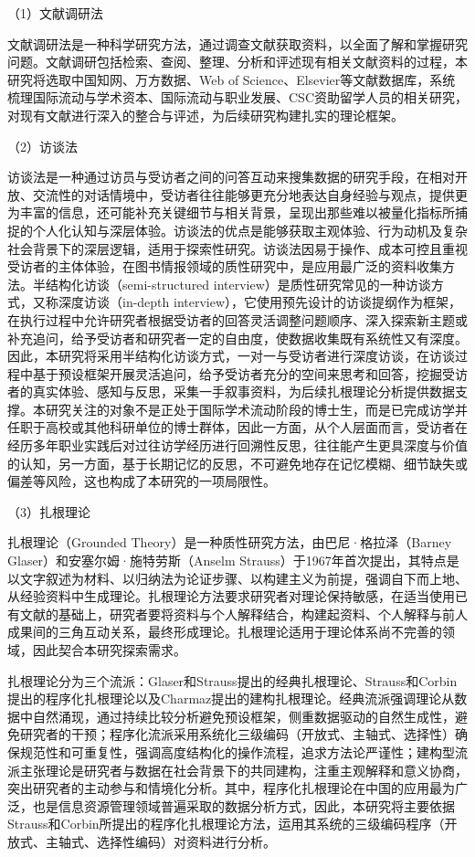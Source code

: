 （1）文献调研法

文献调研法是一种科学研究方法，通过调查文献获取资料，以全面了解和掌握研究问题。文献调研包括检索、查阅、整理、分析和评述现有相关文献资料的过程，本研究将选取中国知网、万方数据、Web of Science、Elsevier等文献数据库，系统梳理国际流动与学术资本、国际流动与职业发展、CSC资助留学人员的相关研究，对现有文献进行深入的整合与评述，为后续研究构建扎实的理论框架。

（2）访谈法

访谈法是一种通过访员与受访者之间的问答互动来搜集数据的研究手段，在相对开放、交流性的对话情境中，受访者往往能够更充分地表达自身经验与观点，提供更为丰富的信息，还可能补充关键细节与相关背景，呈现出那些难以被量化指标所捕捉的个人化认知与深层体验。访谈法的优点是能够获取主观体验、行为动机及复杂社会背景下的深层逻辑，适用于探索性研究。访谈法因易于操作、成本可控且重视受访者的主体体验，在图书情报领域的质性研究中，是应用最广泛的资料收集方法\cite{baoxin2021}。半结构化访谈（semi-structured interview）是质性研究常见的一种访谈方式，又称深度访谈（in-depth interview）\cite{sunxiaoe2012}，它使用预先设计的访谈提纲作为框架，在执行过程中允许研究者根据受访者的回答灵活调整问题顺序、深入探索新主题或补充追问，给予受访者和研究者一定的自由度，使数据收集既有系统性又有深度。因此，本研究将采用半结构化访谈方式，一对一与受访者进行深度访谈，在访谈过程中基于预设框架开展灵活追问，给予受访者充分的空间来思考和回答，挖掘受访者的真实体验、感知与反思，采集一手叙事资料，为后续扎根理论分析提供数据支撑。本研究关注的对象不是正处于国际学术流动阶段的博士生，而是已完成访学并任职于高校或其他科研单位的博士群体，因此一方面，从个人层面而言，受访者在经历多年职业实践后对过往访学经历进行回溯性反思，往往能产生更具深度与价值的认知，另一方面，基于长期记忆的反思，不可避免地存在记忆模糊、细节缺失或偏差等风险，这也构成了本研究的一项局限性。

（3）扎根理论

扎根理论（Grounded Theory）是一种质性研究方法，由巴尼·格拉泽（Barney Glaser）和安塞尔姆·施特劳斯（Anselm Strauss）于1967年首次提出，其特点是以文字叙述为材料、以归纳法为论证步骤、以构建主义为前提，强调自下而上地、从经验资料中生成理论\cite{chenxiangming1999}。扎根理论方法要求研究者对理论保持敏感，在适当使用已有文献的基础上，研究者要将资料与个人解释结合，构建起资料、个人解释与前人成果间的三角互动关系，最终形成理论。扎根理论适用于理论体系尚不完善的领域，因此契合本研究探索需求。

扎根理论分为三个流派：Glaser和Strauss提出的经典扎根理论、Strauss和Corbin提出的程序化扎根理论以及Charmaz提出的建构扎根理论。经典流派强调理论从数据中自然涌现，通过持续比较分析避免预设框架，侧重数据驱动的自然生成性，避免研究者的干预；程序化流派采用系统化三级编码（开放式、主轴式、选择性）确保规范性和可重复性，强调高度结构化的操作流程，追求方法论严谨性；建构型流派主张理论是研究者与数据在社会背景下的共同建构，注重主观解释和意义协商，突出研究者的主动参与和情境化分析。其中，程序化扎根理论在中国的应用最为广泛，也是信息资源管理领域普遍采取的数据分析方式\cite{zhangxiangyihong2025}，因此，本研究将主要依据Strauss和Corbin所提出的程序化扎根理论方法，运用其系统的三级编码程序（开放式、主轴式、选择性编码）对资料进行分析。

